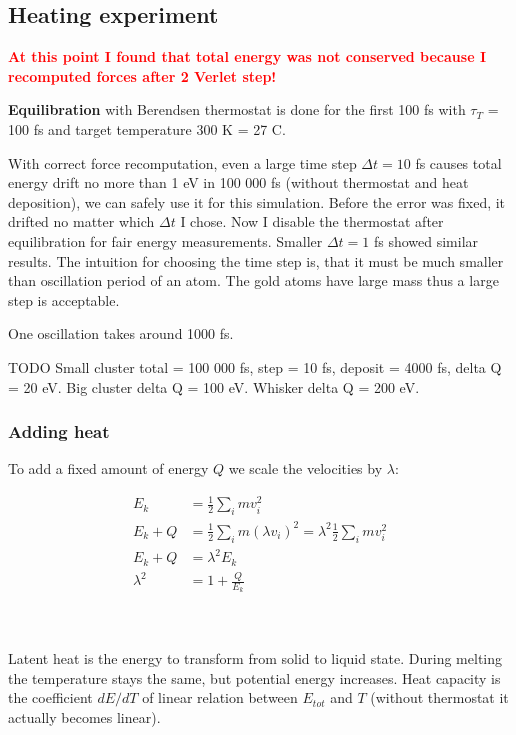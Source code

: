 \documentclass[12pt,a4paper]{article}
\newcommand{\framed}[1]{\tikz[baseline=(char.base)]{\node[shape=rectangle,draw,inner sep=4pt] (char) {#1};}}
\begin{document}
\subsection*{Heating experiment}

\textcolor{red}{\large\bf At this point I found that total energy was not conserved because I recomputed forces after 2 Verlet step!}

{\bf Equilibration} with Berendsen thermostat is done for the first 100 fs with $\tau_T$ = 100 fs and target temperature 300 K = 27 C.

With correct force recomputation, even a large time step $\Delta t=10$ fs causes total energy drift no more than 1 eV in 100 000 fs (without thermostat and heat deposition), we can safely use it for this simulation. Before the error was fixed, it drifted no matter which $\Delta t$ I chose. Now I disable the thermostat after equilibration for fair energy measurements. Smaller $\Delta t = 1$ fs showed similar results. The intuition for choosing the time step is, that it must be much smaller than oscillation period of an atom. The gold atoms have large mass thus a large step is acceptable.

One oscillation takes around 1000 fs.

TODO Small cluster total = 100 000 fs, step = 10 fs, deposit = 4000 fs, delta Q = 20 eV. Big cluster delta Q = 100 eV. Whisker delta Q = 200 eV.

\subsubsection*{Adding heat}

To add a fixed amount of energy $Q$ we scale the velocities by $\lambda$:

\[
\begin{aligned}
	E_k &= \frac{1}{2} \sum_i m v_i^2 \\
	E_k + Q &= \frac{1}{2} \sum_i m (\lambda v_i)^2 = \lambda^2 \frac{1}{2} \sum_i m v_i^2 \\
	E_k + Q &= \lambda^2 E_k \\
	\lambda^2 &= 1 + \frac{Q}{E_k} \\
\end{aligned}
\]

{\centering\framed{ \( \lambda = \sqrt{1 + \frac{Q}{E_k}} \) }\\}

Latent heat is the energy to transform from solid to liquid state. During melting the temperature stays the same, but potential energy increases. Heat capacity is the coefficient $dE/dT$ of linear relation between $E_{tot}$ and $T$ (without thermostat it actually becomes linear).
\end{document}
